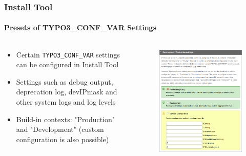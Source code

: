 \begin{frame}[fragile]
	\frametitle{Install Tool}
	\framesubtitle{Presets of TYPO3\_CONF\_VAR Settings}

	\begin{columns}[T]
		\begin{column}{.5\textwidth}

			\begin{itemize}
				\item Certain \texttt{TYPO3\_CONF\_VAR} settings can be configured in Install Tool
				\item Settings such as debug output, deprecation log, devIPmask and other system logs and log levels
				\item Build-in contexts: "Production" and "Development"\newline
					(custom configuration is also possible)
			\end{itemize}

		\end{column}
		\begin{column}{.5\textwidth}

			\begin{figure}\vspace*{-0.4cm}
				\includegraphics[width=0.8\linewidth]{Images/InstallTool/PresetsOfSettings.png}
			\end{figure}

		\end{column}
	\end{columns}

\end{frame}

